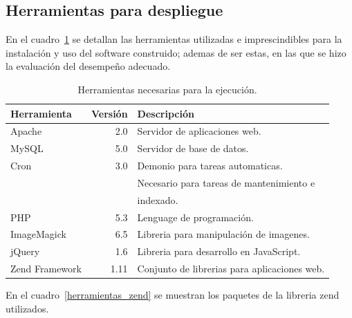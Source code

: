 \documentclass[letter,12pt]{article}
\begin{document}
\subsection{Herramientas para despliegue}
En el cuadro~\ref{herramientas_despliegue} se detallan las herramientas utilizadas e
imprescindibles para la instalación y uso del software construido; ademas de ser estas, en las
que se hizo la evaluación del desempeño adecuado.

\begin{table}
\begin{tabular}{l|r|l}
Herramienta    & Versión & Descripción                                  \\
\hline
Apache         &     2.0 & Servidor de aplicaciones web.                \\
MySQL          &     5.0 & Servidor de base de datos.                   \\
Cron           &     3.0 & Demonio para tareas automaticas.             \\
               &         & Necesario para tareas de mantenimiento e     \\
               &         & indexado.                                    \\
PHP            &     5.3 & Lenguage de programación.                    \\
ImageMagick    &     6.5 & Libreria para manipulación de imagenes.      \\
jQuery         &     1.6 & Libreria para desarrollo en JavaScript.      \\
Zend Framework &    1.11 & Conjunto de librerias para aplicaciones web. \\
\end{tabular}
\caption{Herramientas necesarias para la ejecución.}
\label{herramientas_despliegue}
\end{table}

En el cuadro~\ref{herramientas_zend} se muestran los paquetes de la libreria zend utilizados.
\end{document}
